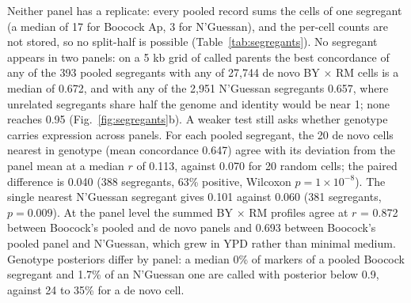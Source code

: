 Neither panel has a replicate: every pooled record sums the cells of one
segregant (a median of 17 for Boocock Ap, 3 for N'Guessan), and the per-cell counts are
not stored, so no split-half is possible (Table~\ref{tab:segregants}). No segregant
appears in two panels: on a 5 kb grid of called parents the best concordance of any of
the 393 pooled segregants with any of 27{,}744 de novo BY $\times$ RM cells is a median
of 0.672, and with any of the 2{,}951 N'Guessan segregants 0.657, where unrelated
segregants share half the genome and identity would be near 1; none reaches 0.95
(Fig.~\ref{fig:segregants}b). A weaker test still asks whether genotype carries
expression across panels. For each pooled segregant, the 20 de novo cells nearest in
genotype (mean concordance 0.647) agree with its deviation from the panel mean at a
median $r$ of 0.113, against 0.070 for 20 random cells; the paired difference is 0.040
(388 segregants, 63\% positive, Wilcoxon $p = 1\times10^{-8}$). The single nearest
N'Guessan segregant gives 0.101 against 0.060 (381 segregants, $p = 0.009$). At the panel
level the summed BY $\times$ RM profiles agree at $r$ = 0.872 between Boocock's pooled
and de novo panels and 0.693 between Boocock's pooled panel and N'Guessan, which grew in
YPD rather than minimal medium. Genotype posteriors differ by panel: a median 0\% of
markers of a pooled Boocock segregant and 1.7\% of an N'Guessan one are called with
posterior below 0.9, against 24 to 35\% for a de novo cell.

\begin{table}[htbp]
\centering
\scriptsize
\setlength{\tabcolsep}{3pt}
\caption[]{\textbf{The segregant panels.} A pooled record sums the cells matched to one
previously genotyped segregant; a de novo record is one cell genotyped from its own
transcripts. The posterior column is the
marker-weighted fraction of a genotype whose called parent has posterior below 0.9.}
\label{tab:segregants}

\end{table}

